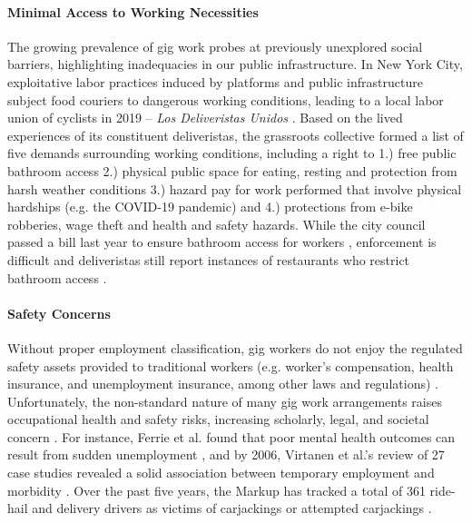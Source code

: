 \paragraph{Minimal Access to Working Necessities}
The growing prevalence of gig work probes at previously unexplored social barriers, highlighting inadequacies in our public infrastructure. In New York City, exploitative labor practices induced by platforms and public infrastructure subject food couriers to dangerous working conditions, leading to a local labor union of cyclists in 2019 -- \textit{Los Deliveristas Unidos} \cite{geschwindt2022biking}. Based on the lived experiences of its constituent deliveristas, the grassroots collective formed a list of five demands surrounding working conditions, including a right to 1.) free public bathroom access 2.) physical public space for eating, resting and protection from harsh weather conditions 3.) hazard pay for work performed that involve physical hardships (e.g. the COVID-19 pandemic) and 4.) protections from e-bike robberies, wage theft and health and safety hazards. While the city council passed a bill last year to ensure bathroom access for workers \cite{nycbill}, enforcement is difficult and deliveristas still report instances of restaurants who restrict bathroom access  \cite{bathroomreport}.

\paragraph{Safety Concerns}
Without proper employment classification, gig workers do not enjoy the regulated safety assets provided to traditional workers (e.g. worker's compensation, health insurance, and unemployment insurance, among other laws and regulations) \cite{boundary, abraham2017measuring, kuhn2021human}. Unfortunately, the non-standard nature of many gig work arrangements raises occupational health and safety risks, increasing scholarly, legal, and societal concern \cite{orr2022necrocapitalism, Howard2017-wd, jbho}. For instance, Ferrie et al. found that poor mental health outcomes can result from sudden unemployment \cite{Ferrie1998-th}, and by 2006, Virtanen et al.'s review of 27 case studies revealed a solid association between temporary employment and morbidity \cite{Virtanen2005-jp}. Over the past five years, the Markup has tracked a total of 361 ride-hail and delivery drivers as victims of carjackings or attempted carjackings \cite{Kerr_undated-zw}.

